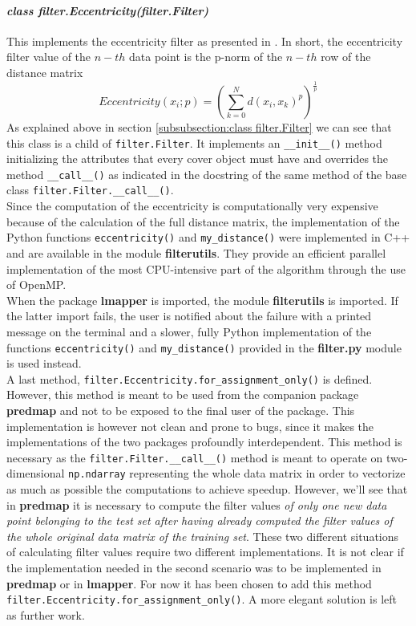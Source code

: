 \paragraph{\textit{class filter.Eccentricity(filter.Filter)}}
This implements the eccentricity filter as presented in \cite{pythonmapper}. In short, the eccentricity filter value of the $n-th$ data point is the p-norm of the $n-th$ row of the distance matrix
$$Eccentricity(x_i; p) = \left(\sum_{k=0}^{N} d(x_i, x_k)^p\right)^\frac{1}{p}$$
As explained above in section \ref{subsubsection:class filter.Filter} we can see that this class is a child of \lstinline|filter.Filter|. It implements an \lstinline|__init__()| method initializing the attributes that every cover object must have and overrides the method \lstinline|__call__()| as indicated in the docstring of the same method of the base class \lstinline|filter.Filter.__call__()|.\\
Since the computation of the eccentricity is computationally very expensive because of the calculation of the full distance matrix, the implementation of the Python functions \lstinline{eccentricity()} and \lstinline{my_distance()} were implemented in C++ and are available in the module \textbf{filterutils}. They provide an efficient parallel implementation of the most CPU-intensive part of the algorithm through the use of OpenMP.\\
When the package \textbf{lmapper} is imported, the module \textbf{filterutils} is imported. If the latter import fails, the user is notified about the failure with a printed message on the terminal and a slower, fully Python implementation of the functions \lstinline{eccentricity()} and \lstinline{my_distance()} provided in the \textbf{filter.py} module is used instead.\\
A last method, \lstinline|filter.Eccentricity.for_assignment_only()| is defined. However, this method is meant to be used from the companion package \textbf{predmap} and not to be exposed to the final user of the package. This implementation is however not clean and prone to bugs, since it makes the implementations of the two packages profoundly interdependent. This method is necessary as the \lstinline|filter.Filter.__call__()| method is meant to operate on two-dimensional \lstinline|np.ndarray| representing the whole data matrix in order to vectorize as much as possible the computations to achieve speedup. However, we'll see that in \textbf{predmap} it is necessary to compute the filter values \textit{of only one new data point belonging to the test set after having already computed the filter values of the whole original data matrix of the training set}. These two different situations of calculating filter values require two different implementations. It is not clear if the implementation needed in the second scenario was to be implemented in \textbf{predmap} or in \textbf{lmapper}. For now it has been chosen to add this method \lstinline|filter.Eccentricity.for_assignment_only()|. A more elegant solution is left as further work.

